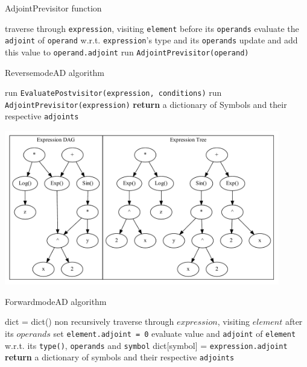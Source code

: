\documentclass{article}
\begin{document}
\begin{algorithm}
\caption{AdjointPrevisitor function}\label{AdjointPrevisitor}
\begin{algorithmic}[1]
\State traverse through \verb|expression|, visiting \verb|element| before its \verb|operands|
\State evaluate the \verb|adjoint| of \verb|operand| w.r.t. \verb|expression|'s type and its \verb|operands|
\State update and add this value to \verb|operand.adjoint|
\State run \verb|AdjointPrevisitor(operand)|
\EndFor
\EndProcedure
\end{algorithmic}
\end{algorithm}

\begin{algorithm}
\caption{ReversemodeAD algorithm}\label{reverseAD}
\begin{algorithmic}[1]
\State run \verb|EvaluatePostvisitor(expression, conditions)|
\State run \verb|AdjointPrevisitor(expression)|
\State \textbf{return} a dictionary of Symbols and their respective \verb|adjoints|
\EndProcedure
\end{algorithmic}
\end{algorithm}

\begin{center}
    \includegraphics[width=12cm]{images/graph.gv.pdf}
\end{center}

\begin{algorithm}
\caption{ForwardmodeAD algorithm}\label{forwardAD}
\begin{algorithmic}[1]
\State dict = dict()
\State non recursively traverse through $expression$, visiting $element$ after its $operands$
    \State set \verb|element.adjoint = 0|
    \State evaluate value and \verb|adjoint| of \verb|element| w.r.t. its \verb|type()|, \verb|operands| and \verb|symbol|
    \State dict[symbol] = \verb|expression.adjoint|
    \EndFor
\EndFor
\State \textbf{return} a dictionary of symbols and their respective \verb|adjoints|
\EndProcedure
\end{algorithmic}
\end{algorithm}
\end{document}

